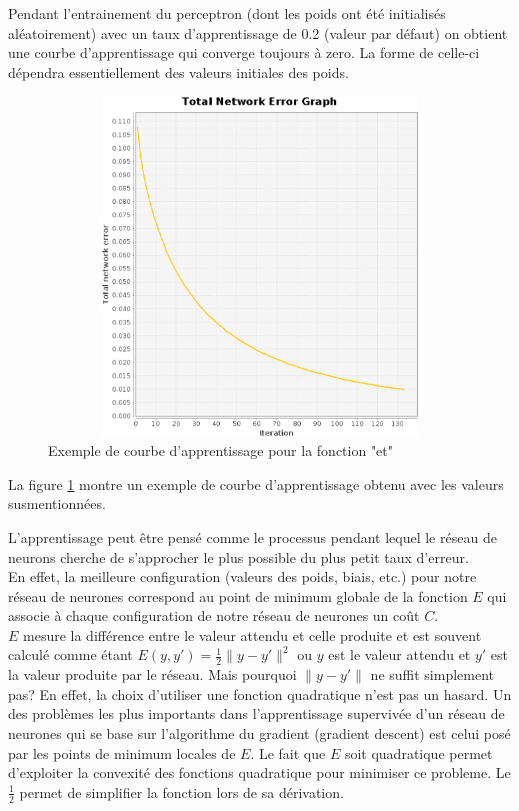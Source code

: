 \documentclass[twoside,openright,a4paper,11pt,french]{article}
\begin{document}
Pendant l'entrainement du perceptron (dont les poids ont été initialisés
aléatoirement) avec un taux d'apprentissage de 0.2 (valeur par
défaut) on obtient une courbe d'apprentissage qui converge toujours à
zero. La forme de celle-ci dépendra essentiellement des valeurs initiales des
poids. 


\begin{figure}[ht]
\centering
\includegraphics[width=12cm,height=9cm]{./pics/and_error1.eps}
\caption{Exemple de courbe d'apprentissage pour la fonction "et"}
\label{fig:anderr}
\end{figure}

La figure \ref{fig:anderr} montre un exemple de courbe d'apprentissage
obtenu avec les valeurs susmentionnées.

L'apprentissage peut être pensé comme le processus pendant lequel le
réseau de neurons cherche de s'approcher le plus possible du plus petit
taux d'erreur.\\

En effet, la meilleure configuration (valeurs des poids, biais, etc.) pour
notre réseau de neurones correspond au point de minimum globale de la fonction
$E$ qui associe à chaque configuration de notre réseau de neurones un coût $C$.\\

$E$ mesure la différence entre le valeur attendu et celle produite et est
souvent calculé comme étant $E(y,y') = \tfrac{1}{2} \lVert y-y'\rVert^2$ ou $y$ est
le valeur attendu et $y'$ est la valeur produite par le réseau.
Mais pourquoi $\lVert y-y'\rVert$ ne suffit simplement pas? 
En effet, la choix d'utiliser une fonction quadratique n'est pas un hasard. 
Un des problèmes les plus importants dans l'apprentissage supervivée d'un réseau
de neurones qui se base sur l'algorithme du gradient (gradient descent) est
celui posé par les points de minimum locales de $E$. Le fait que $E$ soit
quadratique permet d'exploiter la convexité des fonctions quadratique pour
minimiser ce probleme. Le $\tfrac{1}{2}$ permet de simplifier la fonction lors
de sa dérivation.\\
\end{document}
